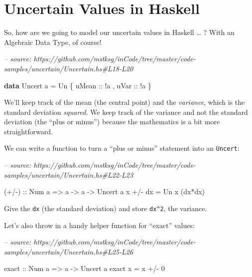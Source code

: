 \documentclass[]{article}
\newenvironment{Shaded}{}{}
\newcommand{\CommentTok}[1]{\textcolor[rgb]{0.38,0.63,0.69}{\textit{#1}}}
\newcommand{\DataTypeTok}[1]{\textcolor[rgb]{0.56,0.13,0.00}{#1}}
\newcommand{\DecValTok}[1]{\textcolor[rgb]{0.25,0.63,0.44}{#1}}
\newcommand{\FunctionTok}[1]{\textcolor[rgb]{0.02,0.16,0.49}{#1}}
\newcommand{\KeywordTok}[1]{\textcolor[rgb]{0.00,0.44,0.13}{\textbf{#1}}}
\newcommand{\NormalTok}[1]{#1}
\newcommand{\OtherTok}[1]{\textcolor[rgb]{0.00,0.44,0.13}{#1}}
\begin{document}
\hypertarget{uncertain-values-in-haskell}{%
\section{Uncertain Values in Haskell}\label{uncertain-values-in-haskell}}

So, how are we going to model our uncertain values in Haskell \ldots{} ? With an
Algebraic Data Type, of course!

\begin{Shaded}
\begin{Highlighting}[]
\CommentTok{-- source: https://github.com/mstksg/inCode/tree/master/code-samples/uncertain/Uncertain.hs#L18-L20}

\KeywordTok{data} \DataTypeTok{Uncert}\NormalTok{ a }\FunctionTok{=} \DataTypeTok{Un}\NormalTok{ \{}\OtherTok{ uMean ::} \FunctionTok{!}\NormalTok{a}
\NormalTok{                   ,}\OtherTok{ uVar  ::} \FunctionTok{!}\NormalTok{a}
\NormalTok{                   \}}
\end{Highlighting}
\end{Shaded}

We'll keep track of the mean (the central point) and the \emph{variance}, which
is the standard deviation \emph{squared}. We keep track of the variance and not
the standard deviation (the ``plus or minus'') because the mathematics is a bit
more straightforward.

We can write a function to turn a ``plus or minus'' statement into an
\texttt{Uncert}:

\begin{Shaded}
\begin{Highlighting}[]
\CommentTok{-- source: https://github.com/mstksg/inCode/tree/master/code-samples/uncertain/Uncertain.hs#L22-L23}

\OtherTok{(+/-) ::} \DataTypeTok{Num}\NormalTok{ a }\OtherTok{=>}\NormalTok{ a }\OtherTok{->}\NormalTok{ a }\OtherTok{->} \DataTypeTok{Uncert}\NormalTok{ a}
\NormalTok{x }\FunctionTok{+/-}\NormalTok{ dx }\FunctionTok{=} \DataTypeTok{Un}\NormalTok{ x (dx}\FunctionTok{*}\NormalTok{dx)}
\end{Highlighting}
\end{Shaded}

Give the \texttt{dx} (the standard deviation) and store \texttt{dx\^{}2}, the
variance.

Let's also throw in a handy helper function for ``exact'' values:

\begin{Shaded}
\begin{Highlighting}[]
\CommentTok{-- source: https://github.com/mstksg/inCode/tree/master/code-samples/uncertain/Uncertain.hs#L25-L26}

\OtherTok{exact ::} \DataTypeTok{Num}\NormalTok{ a }\OtherTok{=>}\NormalTok{ a }\OtherTok{->} \DataTypeTok{Uncert}\NormalTok{ a}
\NormalTok{exact x }\FunctionTok{=}\NormalTok{ x }\FunctionTok{+/-} \DecValTok{0}
\end{Highlighting}
\end{Shaded}
\end{document}
